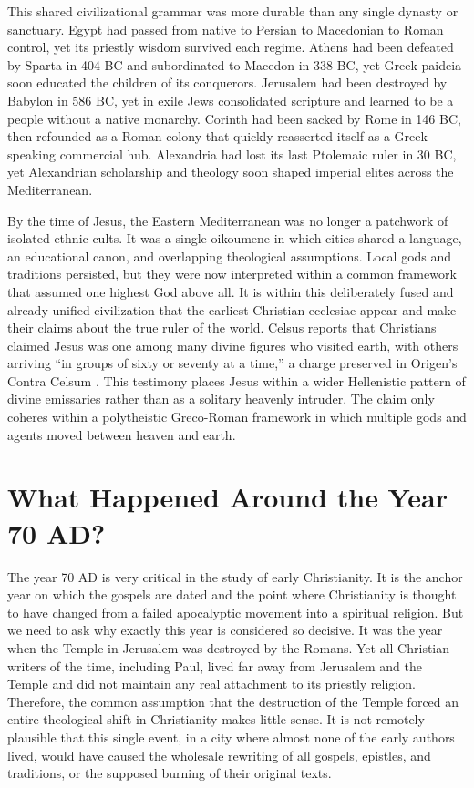 This shared civilizational grammar was more durable than any single dynasty or sanctuary.
Egypt had passed from native to Persian to Macedonian to Roman control, yet its priestly wisdom survived each regime.
Athens had been defeated by Sparta in 404 BC and subordinated to Macedon in 338 BC, yet Greek paideia soon educated the children of its conquerors.
Jerusalem had been destroyed by Babylon in 586 BC, yet in exile Jews consolidated scripture and learned to be a people without a native monarchy.
Corinth had been sacked by Rome in 146 BC, then refounded as a Roman colony that quickly reasserted itself as a Greek-speaking commercial hub.
Alexandria had lost its last Ptolemaic ruler in 30 BC, yet Alexandrian scholarship and theology soon shaped imperial elites across the Mediterranean.

By the time of Jesus, the Eastern Mediterranean was no longer a patchwork of isolated ethnic cults.
It was a single oikoumene in which cities shared a language, an educational canon, and overlapping theological assumptions.
Local gods and traditions persisted, but they were now interpreted within a common framework that assumed one highest God above all.
It is within this deliberately fused and already unified civilization that the earliest Christian ecclesiae appear and make their claims about the true ruler of the world.
Celsus reports that Christians claimed Jesus was one among many divine figures who visited earth, with others arriving ``in groups of sixty or seventy at a time,'' a charge preserved in Origen's Contra Celsum \cite{origen:contracels}.
This testimony places Jesus within a wider Hellenistic pattern of divine emissaries rather than as a solitary heavenly intruder.
The claim only coheres within a polytheistic Greco-Roman framework in which multiple gods and agents moved between heaven and earth.

\section{What Happened Around the Year 70 AD?}\label{sec:what-exactly-happen-near-year-70-ad}

The year 70 AD is very critical in the study of early Christianity.
It is the anchor year on which the gospels are dated and the point where Christianity is thought to have changed from a failed apocalyptic movement into a spiritual religion.
But we need to ask why exactly this year is considered so decisive.
It was the year when the Temple in Jerusalem was destroyed by the Romans.
Yet all Christian writers of the time, including Paul, lived far away from Jerusalem and the Temple and did not maintain any real attachment to its priestly religion.
Therefore, the common assumption that the destruction of the Temple forced an entire theological shift in Christianity makes little sense.
It is not remotely plausible that this single event, in a city where almost none of the early authors lived, would have caused the wholesale rewriting of all gospels, epistles, and traditions, or the supposed burning of their original texts.

